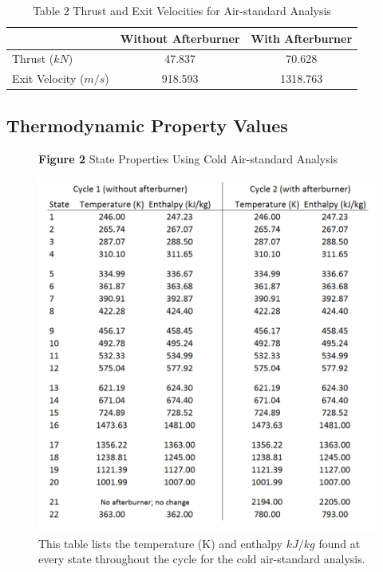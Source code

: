 \documentclass[11pt]{article} %
\begin{document}
\begin{table}[h]
\centering
\caption{Table 2 Thrust and Exit Velocities for Air-standard Analysis}\par\medskip
\label{tab:air_standard_thrust_velocities}
\begin{tabular}{@{}lcc@{}}
\toprule
                           & \multicolumn{1}{r}{Without Afterburner} & \multicolumn{1}{r}{With Afterburner} \\ \midrule
Thrust ($\si{kN}$)         & 47.837                                  & 70.628                               \\
Exit Velocity ($\si{m/s}$) & 918.593                                 & 1318.763                             \\ \bottomrule
\end{tabular}
\end{table}

\pagebreak
\subsection*{Thermodynamic Property Values}

\begin{figure}[!hp]
  \centering
  \textbf{Figure 2} State Properties Using Cold Air-standard Analysis\par\medskip
  \includegraphics[scale=0.832]{cold_air_data.png}
  \caption{This table lists the temperature (K) and enthalpy $\si{kJ/kg}$ found at every state throughout the cycle for the cold air-standard analysis.}
  \label{fig:cold_air_data}
\end{figure}
\end{document}
